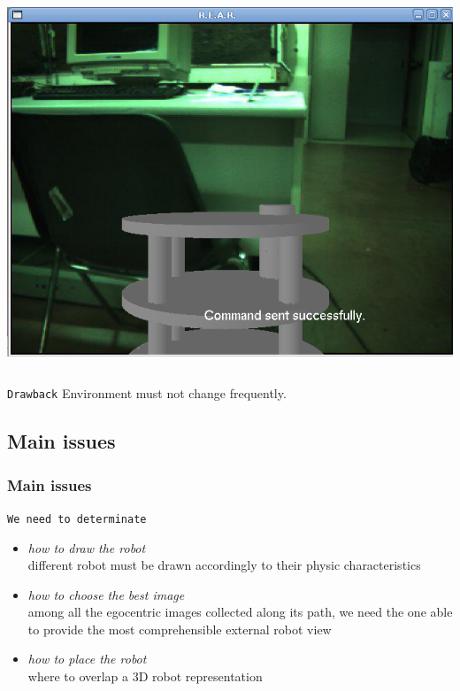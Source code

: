 {\begin{columns}
     {
      \includegraphics[width=\textwidth]{img/virtual_exocentric.png}
    }
    
  \end{columns}
  
  \pause
  
  \begin{block} {\alert{\texttt{Drawback}}}
    Environment must not change frequently.
  \end{block}


}

\subsection{Main issues}
\frame
{
  \frametitle{Main issues}


  
  \begin{block} {\alert{\texttt{We need to determinate}}}
    
    \pause
    
    \begin{itemize}
      
    \item \alert{\textit{how to draw the robot}} \\
      different robot must be drawn accordingly to
      their physic characteristics
      \pause
      
    \item \alert{\textit{how to choose the best image}} \\
      among all the egocentric images collected along
      its path, we need the one able to provide the most
      comprehensible external robot view
      \pause
      
    \item \alert{\textit{how to place the robot}} \\
      where to overlap a 3D robot representation      
      
    \end{itemize}
    
  \end{block}
}
